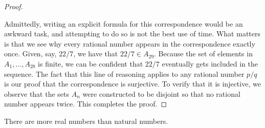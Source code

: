 \begin{proof}
\begin{tightfigure}
  \end{tightfigure}

  Admittedly, writing an explicit formula for this correspondence
  would be an awkward task, and attempting to do so is not the best
  use of time. What matters is that we see why every rational number
  appears in the correspondence exactly once. Given, say, $22/7$, we
  have that $22/7 \in A_{29}$. Because the set of elements in $A_1,
  \dots, A_{28}$ is finite, we can be confident that $22/7$
  eventually gets included in the sequence. The fact that this line
  of reasoning applies to any rational number $p/q$ is our proof that
  the correspondence is surjective. To verify that it is injective,
  we observe that the sets $A_n$ were constructed to be disjoint so
  that no rational number appears twice. This completes the proof.
\end{proof}

\begin{theorem}[$\abs{\RR} > \abs{\NN}$]
  There are more real numbers than natural numbers.
\end{theorem}

